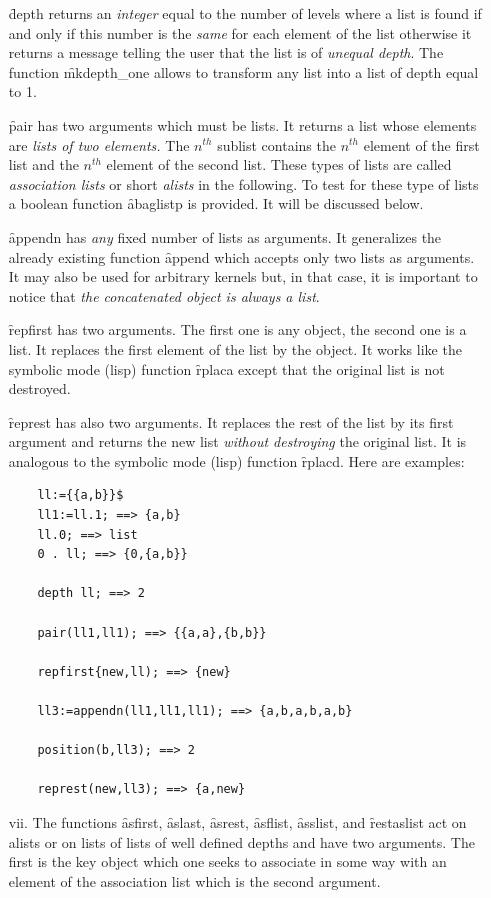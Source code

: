 \begin{itemize}
\f{depth} returns an \emph{integer} equal to the number of levels where a
list is found if and only if this number is the \emph{same} for each
element of the list  otherwise it returns a message telling the user
that the list is of \emph{unequal depth}. The function \f{mkdepth\_one}
allows to transform any list into a list of depth equal to 1.

\f{pair} has two arguments which must be lists. It returns a list
whose elements are \emph{lists of two elements.}
The $n^{th}$ sublist contains the $n^{th}$ element of the first list
and the $n^{th}$ element of the second list. These types of lists are called
\emph{association lists} or short \emph{alists} in the following.
To test for these type of lists a boolean function \f{abaglistp}
is provided. It will be discussed below.

\f{appendn} has \emph{any} fixed number of lists as arguments. It
generalizes the already existing function \f{append} which accepts
only two lists as arguments. It may also be used for arbitrary kernels
but, in that case, it is important to notice that \emph{the concatenated
object is always a list}.

\f{repfirst} has two arguments. The first one is any object, the second one
is a list. It replaces the first element of the list by the object. It
works like the symbolic mode (lisp) function \f{rplaca} except that the
original list is not destroyed.

\f{represt} has also two arguments. It replaces the rest of the list by
its first argument and returns the new list \emph{without destroying} the
original list. It is analogous to the symbolic mode (lisp) function \f{rplacd}.
Here are examples:
\begin{verbatim}
    ll:={{a,b}}$
    ll1:=ll.1; ==> {a,b}
    ll.0; ==> list
    0 . ll; ==> {0,{a,b}}

    depth ll; ==> 2

    pair(ll1,ll1); ==> {{a,a},{b,b}}

    repfirst{new,ll); ==> {new}

    ll3:=appendn(ll1,ll1,ll1); ==> {a,b,a,b,a,b}

    position(b,ll3); ==> 2

    represt(new,ll3); ==> {a,new}
\end{verbatim}
\item[vii.]
\hypertarget{operator:ASFIRST}{}
\hypertarget{operator:ASLAST}{}
\hypertarget{operator:ASREST}{}
\hypertarget{operator:ASFLIST}{}
\hypertarget{operator:ASSLIST}{}
\hypertarget{operator:RESTASLIST}{}
The functions \f{asfirst}, \f{aslast}, \f{asrest}, \f{asflist}, \f{asslist}, and \f{restaslist}
act on alists or on lists of lists of well defined depths
and have two arguments. The first is the key object
which one seeks to associate in some way with an element of the association
list which is the second argument.


\end{itemize}
